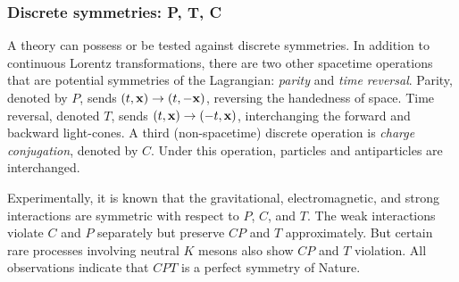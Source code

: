 \subsubsection{Discrete symmetries: P, T, C}
\label{sec:discrete-symmetries}

A theory can possess or be tested against discrete symmetries. In addition to continuous Lorentz transformations, there are two other spacetime operations that are potential symmetries of the Lagrangian: \emph{parity} and \emph{time reversal}. Parity, denoted by $P$, sends $(t,\vb{x})\rightarrow(t,-\vb{x})$, reversing the handedness of space. Time reversal, denoted $T$, sends $(t,\vb{x})\rightarrow(-t,\vb{x})$, interchanging the forward and backward light-cones. A third (non-spacetime) discrete operation is \emph{charge conjugation}, denoted by $C$. Under this operation, particles and antiparticles are interchanged.

Experimentally, it is known that the gravitational, electromagnetic, and strong interactions are symmetric with respect to $P$, $C$, and $T$. The weak interactions violate $C$ and $P$ separately but preserve $CP$ and $T$ approximately. But certain rare processes involving neutral $K$ mesons also show $CP$ and $T$ violation. All observations indicate that $CPT$ is a perfect symmetry of Nature.


